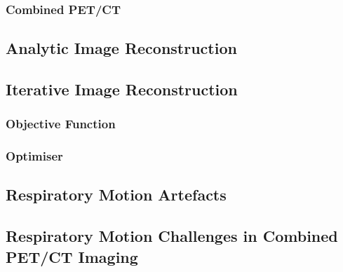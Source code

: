                 \subsubsection{Combined PET/CT} \label{combined_pet_ct}
                    \blindtext
    
        \blindtext
        
        \subsection{Analytic Image Reconstruction} \label{analytic_image_reconstruction}
            \blindtext
        
        \subsection{Iterative Image Reconstruction} \label{iterative_image_reconstruction}
            \blindtext
            
            \subsubsection{Objective Function} \label{iterative_image_reconstruction_objective_function}
                \blindtext
                
            \subsubsection{Optimiser} \label{iterative_image_reconstruction_optimiser}
                \blindtext
    
        \blindtext
        
        \subsection{Respiratory Motion Artefacts} \label{respiratory_motion_artefacts}
            \blindtext
            
        \subsection{Respiratory Motion Challenges in Combined PET/CT Imaging} \label{respiratory_motion_challenges_in_combined_pet_ct_imaging}
            \blindtext
            
